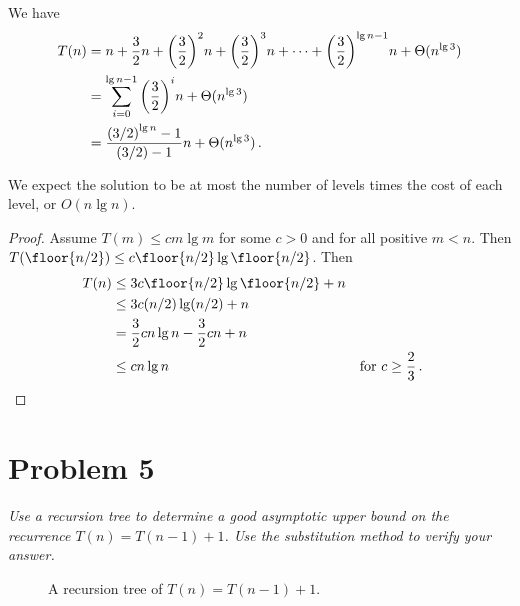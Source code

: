 \documentclass{abrice}
\begin{document}
\noindent
We have
\begin{align*}
  T(n) &= n + {3 \over 2} n + {\left( {3 \over 2 } \right)}^2 n + {\left( {3
         \over 2 } \right)}^3 n + \cdots + {\left( {3 \over 2 } \right)}^{\lg n -
         1} n + \Theta (n^{\lg 3}) \\
  &= \sum_{i = 0}^{\lg n - 1} {\left( {3 \over 2} \right)}^i n + \Theta(n^{\lg
    3}) \\
  &= {{(3/2)}^{\lg n} - 1 \over (3/2) - 1} n + \Theta(n^{\lg 3}) \, .
\end{align*}

We expect the solution to be at most the number of levels times the cost of each
level, or $O(n \lg n)$.

\begin{proof}
  Assume $T(m) \leq cm \lg m$ for some $c > 0$ and for all positive $m <
  n$. Then $T(\floor{n / 2}) \leq c \floor{n / 2} \lg \floor{n / 2}$. Then
  \begin{align*}
    T(n) &\leq 3 c \floor{n / 2} \lg \floor{n / 2} + n\\
    &\leq 3 c (n / 2) \lg(n / 2) + n \\
    &= {3 \over 2} c n \lg n - {3 \over 2} c n + n \\
    &\leq c n \lg n && \text{for } c \geq {2 \over 3} \, .
  \end{align*}
\end{proof}

\section{Problem 5}
\emph{Use a recursion tree to determine a good asymptotic upper bound on the
  recurrence $T(n) = T(n - 1) + 1$. Use the substitution method to verify your
  answer.}
\medskip

\begin{figure*}
  \centering
  \caption{A recursion tree of $T(n) = T(n-1) + 1$.}
\end{figure*}
\end{document}
